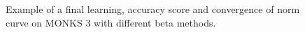 \begin{appendices}
\begin{figure}[H]
\begin{subfigure}{0.40\textwidth}
                    \label{fig:monks_3_ACC_CGD}
                \end{subfigure}
                \begin{subfigure}{0.40\textwidth}
                    \caption{}
                    \label{fig:monks_3_NORM_CGD}
                \end{subfigure}
                \caption{Example of a final learning, accuracy score and convergence of norm curve on MONKS 3 with different beta methods.}
                \label{fig:monks_3_CGD}
            \end{figure}





\end{appendices}
